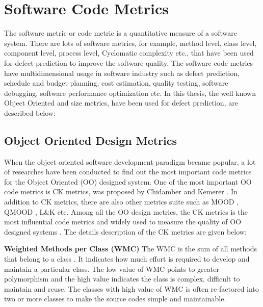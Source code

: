 \documentclass[12pt]{report}
\begin{document}
\section{Software Code Metrics}
\label{software_code_metrics_description}
The software metric or code metric is a quantitative measure of a software system. There are lots of software metrics, for example, method level, class level, component level, process level, Cyclomatic complexity etc.,  that have been used for defect prediction to improve the software quality. The software code metrics have multidimensional usage in software industry such as defect prediction, schedule and budget planning, cost estimation, quality testing, software debugging, software performance optimization etc. In this thesis, the well known Object Oriented and size metrics, have been used for defect prediction, are described below:


\subsection{Object Oriented Design Metrics}
\label{Code_Metrics_background_study}
When the object oriented software development paradigm became popular, a lot of researches have been conducted to find out the most important code metrics for the Object Oriented (OO) designed system. One of the most important OO code metrics is CK metrics, was proposed by Chidamber and Kemerer \cite{chidamber1994metrics}. In addition to CK metrics, there are also other metrics suite such as MOOD \cite{bansiya2002hierarchical}, QMOOD \cite{olague2007empirical}, L\&K \cite{abreu1994object} etc. Among all the OO design metrics, the CK metrics is the most influential code metrics and widely used to measure the quality of OO designed systems \cite{catal2009systematic,he2015empirical,okutan2014software}. The details description of the CK metrics are given below:

\textbf{Weighted Methods per Class (WMC)}
The WMC is the sum of all methods that belong to a class \cite{chidamber1994metrics}. It indicates how much effort is required to develop and maintain a particular class. The low value of WMC points to greater polymorphism and the high value indicates the class is complex, difficult to maintain and reuse. The classes with high value of WMC is often re-factored into two or more classes to make the source codes simple and maintainable.
\end{document}
